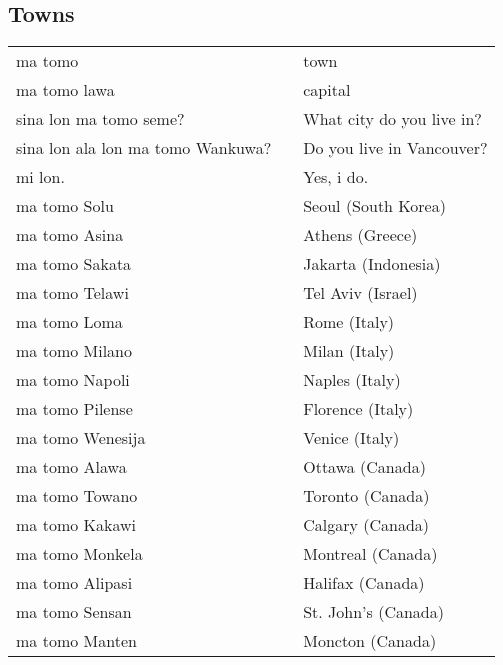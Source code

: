 %
%
\subsection{Towns}
%
\begin{supertabular}{p{4,5cm}|ll}
    ma tomo                           &  & town                      \\
    ma tomo lawa                      &  & capital                   \\
    sina lon ma tomo seme?            &  & What city do you live in? \\
    sina lon ala lon ma tomo Wankuwa? &  & Do you live in Vancouver? \\
    mi lon.                           &  & Yes, i do.                \\
    ma tomo Solu                      &  & Seoul (South Korea)       \\
    ma tomo Asina                     &  & Athens (Greece)           \\
    ma tomo Sakata                    &  & Jakarta (Indonesia)       \\
    ma tomo Telawi                    &  & Tel Aviv (Israel)         \\
    ma tomo Loma                      &  & Rome (Italy)              \\
    ma tomo Milano                    &  & Milan (Italy)             \\
    ma tomo Napoli                    &  & Naples (Italy)            \\
    ma tomo Pilense                   &  & Florence (Italy)          \\
    ma tomo Wenesija                  &  & Venice (Italy)            \\
    ma tomo Alawa                     &  & Ottawa (Canada)           \\
    ma tomo Towano                    &  & Toronto (Canada)          \\
    ma tomo Kakawi                    &  & Calgary (Canada)          \\
    ma tomo Monkela                   &  & Montreal (Canada)         \\
    ma tomo Alipasi                   &  & Halifax (Canada)          \\
    ma tomo Sensan                    &  & St. John's (Canada)       \\
    ma tomo Manten                    &  & Moncton (Canada)          \\

\end{supertabular}
